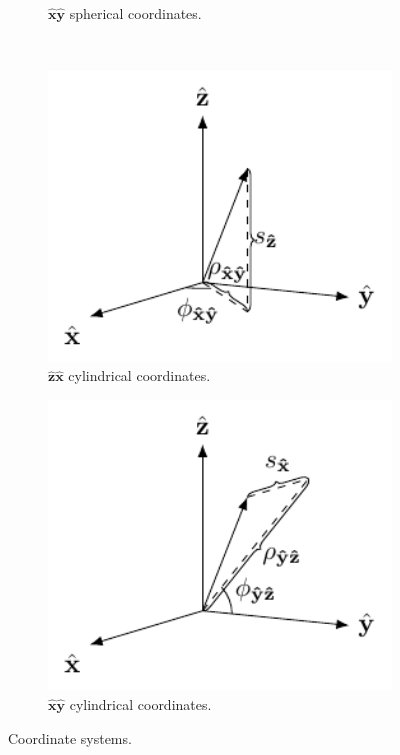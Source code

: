 \documentclass[11pt]{article}
\providecommand{\mb}[1]{\mathbf{#1}}
\begin{document}
\begin{figure}[h]
\begin{subfigure}[t]{0.25\textwidth}
   \caption{$\hat{\mathbf{x}}\mb{\hat{y}}$ spherical coordinates.}
   \label{fig:frames_b}
 \end{subfigure}%
~
 \begin{subfigure}[t]{0.25\textwidth}
   \centering
   \includegraphics[width = 1.0\textwidth]{../figures/frames/frames_d.pdf}
   \caption{$\hat{\mathbf{z}}\mb{\hat{x}}$ cylindrical coordinates.}
   \label{fig:frames_c}
 \end{subfigure}%
  \begin{subfigure}[t]{0.25\textwidth}
   \centering
   \includegraphics[width = 1.0\textwidth]{../figures/frames/frames_c.pdf}
   \caption{$\hat{\mathbf{x}}\mb{\hat{y}}$ cylindrical coordinates.}
   \label{fig:frames_c}
 \end{subfigure}%

 \caption{Coordinate systems.}
 \label{fig:frames}
\end{figure}
\end{document}
